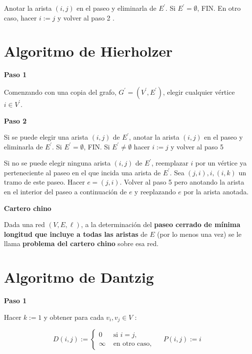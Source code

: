 \documentclass[openany]{book}
\begin{document}
Anotar la arista $(i, j)$ en el paseo y eliminarla de $E^{\prime} .$ Si $E^{\prime}=\emptyset$, FIN. En otro caso, hacer $i:=j$ y volver al paso 2 .

\section{Algoritmo de Hierholzer}

\begin{center}
\textbf{Paso 1}
\end{center}

Comenzando con una copia del grafo, $G^{\prime}=\left(V^{\prime}, E^{\prime}\right)$, elegir cualquier vértice $i \in V^{\prime}$.

\begin{center}
\textbf{Paso 2}
\end{center}

Si se puede elegir una arista $(i, j)$ de $E^{\prime}$, anotar la arista $(i, j)$ en el paseo y eliminarla de $E^{\prime} .$ Si $E^{\prime}=\emptyset$, FIN. Si $E^{\prime} \neq \emptyset$ hacer $i:=j$ y volver al paso 5

Si no se puede elegir ninguna arista $(i, j)$ de $E^{\prime}$, reemplazar $i$ por un vértice ya perteneciente al paseo en el que incida una arista de $E^{\prime} .$ Sea $(j, i), i,(i, k)$ un tramo de este paseo. Hacer $e=(j, i)$. Volver al paso 5 pero anotando la arista en el interior del paseo a continuación de $e$ y reeplazando $e$ por la arista anotada.


\begin{definition}{ \color{turquoise} \textbf{Cartero chino}}



  Dada una red $(V, E, \ell)$, a la determinación del \textbf{paseo cerrado de mínima longitud que incluye a todas las aristas} de $E$ (por lo menos una vez) se le llama \textbf{problema del cartero chino} sobre esa red.
\end{definition}

\section{Algoritmo de Dantzig}

\begin{center}
\textbf{Paso 1}
\end{center}

Hacer $k:=1$ y obtener para cada $v_{i}, v_{j} \in V$ :

$$
D(i, j):=\left\{\begin{array}{ll}
0 & \text { si } i=j, \\
\infty & \text { en otro caso, }
\end{array} \quad P(i, j):=i\right.
$$
\end{document}
